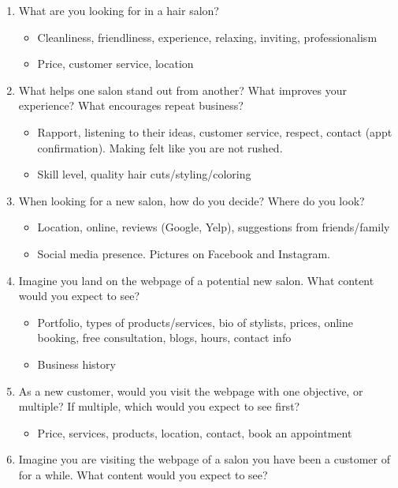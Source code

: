 \begin{enumerate}
\item
  What are you looking for in a hair salon?
  \begin{itemize}
  \item
    Cleanliness, friendliness, experience, relaxing, inviting, professionalism
  \item
    Price, customer service, location
  \end{itemize}
\item
  What helps one salon stand out from another? What improves your experience? What encourages repeat business?
  \begin{itemize}
  \item
    Rapport, listening to their ideas, customer service, respect, contact (appt confirmation). Making felt like you are not rushed.
  \item
    Skill level, quality hair cuts/styling/coloring
  \end{itemize}
\item
  When looking for a new salon, how do you decide? Where do you look?
  \begin{itemize}
  \item
    Location, online, reviews (Google, Yelp), suggestions from friends/family
  \item
    Social media presence. Pictures on Facebook and Instagram.
  \end{itemize}
\item
  Imagine you land on the webpage of a potential new salon. What content would you expect to see?
  \begin{itemize}
  \item
    Portfolio, types of products/services, bio of stylists, prices, online booking, free consultation, blogs, hours, contact info
  \item
    Business history
  \end{itemize}
\item
  As a new customer, would you visit the webpage with one objective, or multiple? If multiple, which would you expect to see first?
  \begin{itemize}
  \item
    Price, services, products, location, contact, book an appointment
  \end{itemize}
\item
  Imagine you are visiting the webpage of a salon you have been a customer of for a while. What content would you expect to see?
  \begin{itemize}

\end{itemize}
\end{enumerate}
